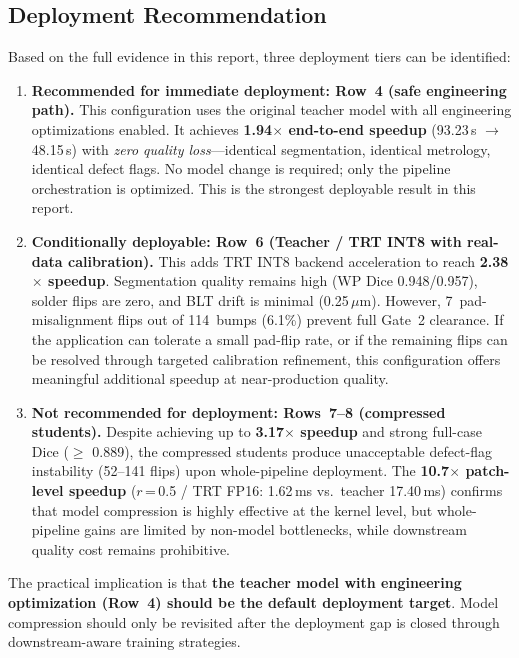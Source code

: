 \subsection{Deployment Recommendation}

Based on the full evidence in this report, three deployment tiers can be identified:

\begin{enumerate}
\item \textbf{Recommended for immediate deployment: Row~4 (safe engineering path).} This configuration uses the original teacher model with all engineering optimizations enabled. It achieves \textbf{1.94$\times$ end-to-end speedup} (93.23\,s $\to$ 48.15\,s) with \emph{zero quality loss}---identical segmentation, identical metrology, identical defect flags. No model change is required; only the pipeline orchestration is optimized. This is the strongest deployable result in this report.

\item \textbf{Conditionally deployable: Row~6 (Teacher / TRT INT8 with real-data calibration).} This adds TRT INT8 backend acceleration to reach \textbf{2.38$\times$ speedup}. Segmentation quality remains high (WP Dice 0.948/0.957), solder flips are zero, and BLT drift is minimal (0.25\,$\mu$m). However, 7~pad-misalignment flips out of 114~bumps (6.1\%) prevent full Gate~2 clearance. If the application can tolerate a small pad-flip rate, or if the remaining flips can be resolved through targeted calibration refinement, this configuration offers meaningful additional speedup at near-production quality.

\item \textbf{Not recommended for deployment: Rows~7--8 (compressed students).} Despite achieving up to \textbf{3.17$\times$ speedup} and strong full-case Dice ($\geq$ 0.889), the compressed students produce unacceptable defect-flag instability (52--141 flips) upon whole-pipeline deployment. The \textbf{10.7$\times$ patch-level speedup} ($r$\,=\,0.5 / TRT FP16: 1.62\,ms vs.\ teacher 17.40\,ms) confirms that model compression is highly effective at the kernel level, but whole-pipeline gains are limited by non-model bottlenecks, while downstream quality cost remains prohibitive.
\end{enumerate}

The practical implication is that \textbf{the teacher model with engineering optimization (Row~4) should be the default deployment target}. Model compression should only be revisited after the deployment gap is closed through downstream-aware training strategies.

